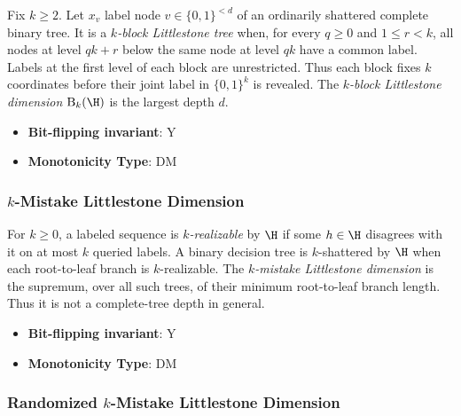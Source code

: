       \begin{definition}\label{def:k-block_littlestone_dimension_(kge2)}
      Fix $k\ge2$.  Let $x_v$ label node $v\in\{0,1\}^{<d}$ of an ordinarily shattered complete binary tree.  It is a \emph{$k$-block Littlestone tree} when, for every $q\ge0$ and $1\le r<k$, all nodes at level $qk+r$ below the same node at level $qk$ have a common label.  Labels at the first level of each block are unrestricted.  Thus each block fixes $k$ coordinates before their joint label in $\{0,1\}^k$ is revealed.  The \emph{$k$-block Littlestone dimension} $\mathrm{B}_k(\H)$ is the largest depth $d$.
      \end{definition}
      \begin{itemize}
      \item {\bf Bit-flipping invariant}: Y
      \item {\bf Monotonicity Type}: DM
      \end{itemize}
\subsubsection{$k$-Mistake Littlestone Dimension}
      
      \begin{definition}\label{def:kmistake_littlestone_dimension}
      For $k\ge0$, a labeled sequence is \emph{$k$-realizable} by $\H$ if some $h\in\H$ disagrees with it on at most $k$ queried labels.  A binary decision tree is $k$-shattered by $\H$ when each root-to-leaf branch is $k$-realizable.  The \emph{$k$-mistake Littlestone dimension} is the supremum, over all such trees, of their minimum root-to-leaf branch length.  Thus it is not a complete-tree depth in general.
      \end{definition}
      \begin{itemize}
      \item {\bf Bit-flipping invariant}: Y
      \item {\bf Monotonicity Type}: DM
      \end{itemize}
\subsubsection{Randomized $k$-Mistake Littlestone Dimension}
      
